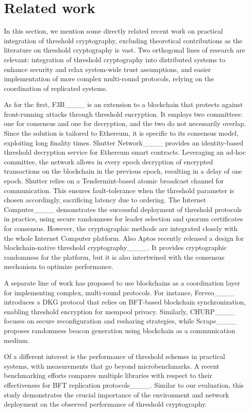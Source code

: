 \section{Related work}
\label{sec:relwork}
In this section, we mention some directly related recent work on practical integration of threshold cryptography, excluding theoretical contributions as the literature on threshold cryptography is vast.
Two orthogonal lines of research are relevant: integration of threshold cryptography into distributed systems to enhance security and relax system-wide trust assumptions, and easier implementation of more complex multi-round protocols, relying on the coordination of replicated systems. 

As for the first, 
F3B____ is an extension to a blockchain that protects against front-running attacks through threshold encryption.  It employs two committees: one for consensus and one for decryption, and the two do not necessarily overlap.  Since the solution is tailored to Ethereum, it is specific to its consensus model, exploiting long finality times. 
Shutter Network____ provides an identity-based threshold decryption service for Ethereum smart contracts. Leveraging an ad-hoc committee, the network allows in every epoch decryption of encrypted transactions on the blockchain in the previous epoch, resulting in a delay of one epoch. Shutter relies on a Tendermint-based atomic broadcast channel for communication. This ensures fault-tolerance when the threshold parameter is chosen accordingly, sacrificing latency due to ordering.
The Internet Computer____ demonstrates the successful deployment of threshold protocols in practice, using secure randomness for leader selection and quorum certificates for consensus. However, the cryptographic methods are integrated closely with the whole Internet Computer platform.
Also Aptos recently released a design for blockchain-native threshold cryptography____.  It provides cryptographic randomness for the platform, but it is also intertwined with the consensus mechanism to optimize performance.

A separate line of work has proposed to use blockchains as a coordination layer for implementing complex, multi-round protocols. For instance, Ferveo____ introduces a DKG protocol that relies on BFT-based blockchain synchronization, enabling threshold encryption for mempool privacy. Similarly, CHURP____ focuses on secure reconfiguration and resharing strategies, while Scrape____ proposes randomness beacon generation using blockchain as a communication medium.

Of a different interest is the performance of threshold schemes in practical systems, with measurements that go beyond microbenchmarks. A recent benchmarking efforts compares multiple libraries with respect to their effectiveness for BFT replication protocols____. 
Similar to our evaluation, this study demonstrates the crucial importance of the environment and network deployment on the observed performance of threshold cryptography.